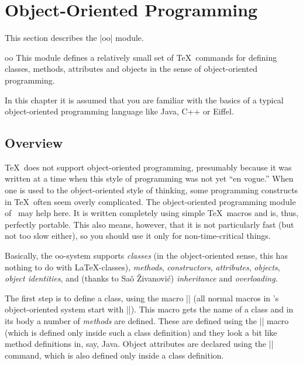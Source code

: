 %
%
%



\section{Object-Oriented Programming}

\label{section-oop}

This section describes the |oo| module.

\begin{pgfmodule}{oo}
  This module defines a relatively small set of \TeX\ commands for
  defining classes, methods, attributes and objects in the sense of
  object-oriented programming.
\end{pgfmodule}

In this chapter it is assumed that you are familiar with the basics
of a typical object-oriented programming language like Java, C++ or
Eiffel.



\subsection{Overview}

\TeX\ does not support object-oriented programming, presumably because
it was written at a time when this style of programming was not yet
``en vogue.'' When one is used to the object-oriented style of
thinking, some programming constructs in \TeX\ often seem overly
complicated. The object-oriented programming module of \pgfname\ may
help here. It is written completely using simple \TeX\ macros and is,
thus, perfectly portable. This also means, however, that it is not
particularly fast (but not too slow either), so you should use it only
for non-time-critical things.

Basically, the oo-system supports \emph{classes} (in the
object-oriented sense, this has nothing to do with \LaTeX-classes),
\emph{methods}, \emph{constructors}, \emph{attributes},
\emph{objects}, \emph{object identities}, and (thanks to Sa\v o \v
Zivanovi\'c) \emph{inheritance} and \emph{overloading.} 

The first step is to define a class, using the macro |\pgfooclass|
(all normal macros in \pgfname's object-oriented system start with
|\pgfoo|). This macro gets the name of a class and in its body a
number of \emph{methods} are defined. These are defined using the
|\method| macro (which is defined only inside such a class definition)
and they look a bit like method definitions in, say, Java. Object
attributes are declared using the |\attribute| command, which is also
defined only inside a class definition.

